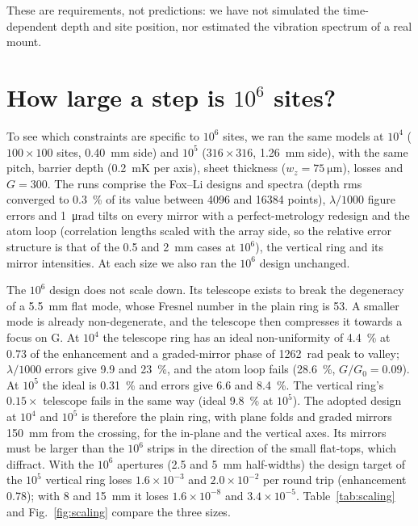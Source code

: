 \documentclass[11pt]{article}
\begin{document}
These are requirements, not predictions: we have not simulated the time-dependent depth and site
position, nor estimated the vibration spectrum of a real mount.

\section{How large a step is $10^{6}$ sites?}
\label{sec:scaling}

To see which constraints are specific to $10^{6}$ sites, we ran the same models at $10^{4}$
($100\times100$ sites, \SI{0.40}{\milli\metre} side) and $10^{5}$ ($316\times316$,
\SI{1.26}{\milli\metre} side), with the same pitch, barrier depth (\SI{0.2}{\milli\kelvin} per axis),
sheet thickness ($w_z = \SI{75}{\micro\metre}$), losses and $G = 300$. The runs comprise the Fox--Li
designs and spectra (depth rms converged to \SI{0.3}{\percent} of its value between 4096 and 16384
points), $\lambda/1000$ figure errors and \SI{1}{\micro\radian} tilts on every mirror with a
perfect-metrology redesign and the atom loop (correlation lengths scaled with the array side, so the
relative error structure is that of the 0.5 and \SI{2}{\milli\metre} cases at $10^{6}$), the vertical
ring and its mirror intensities. At each size we also ran the $10^{6}$ design unchanged.

The $10^{6}$ design does not scale down. Its telescope exists to break the degeneracy of a
\SI{5.5}{\milli\metre} flat mode, whose Fresnel number in the plain ring is 53. A smaller mode is
already non-degenerate, and the telescope then compresses it towards a focus on G. At $10^{4}$ the
telescope ring has an ideal non-uniformity of \SI{4.4}{\percent} at 0.73 of the enhancement and a
graded-mirror phase of \SI{1262}{\radian} peak to valley; $\lambda/1000$ errors give 9.9 and
\SI{23}{\percent}, and the atom loop fails (\SI{28.6}{\percent}, $G/G_0 = 0.09$). At $10^{5}$ the ideal is
\SI{0.31}{\percent} and errors give 6.6 and \SI{8.4}{\percent}. The vertical ring's $0.15\times$ telescope
fails in the same way (ideal \SI{9.8}{\percent} at $10^{5}$). The adopted design at $10^{4}$ and $10^{5}$
is therefore the plain ring, with plane folds and graded mirrors \SI{150}{\milli\metre} from the crossing,
for the in-plane and the vertical axes. Its mirrors must be larger than the $10^{6}$ strips in the
direction of the small flat-tops, which diffract. With the $10^{6}$ apertures (2.5 and
\SI{5}{\milli\metre} half-widths) the design target of the $10^{5}$ vertical ring loses $1.6\times10^{-3}$
and $2.0\times10^{-2}$ per round trip (enhancement 0.78); with 8 and \SI{15}{\milli\metre} it loses
$1.6\times10^{-8}$ and $3.4\times10^{-5}$. Table~\ref{tab:scaling} and Fig.~\ref{fig:scaling} compare the three sizes.
\end{document}
